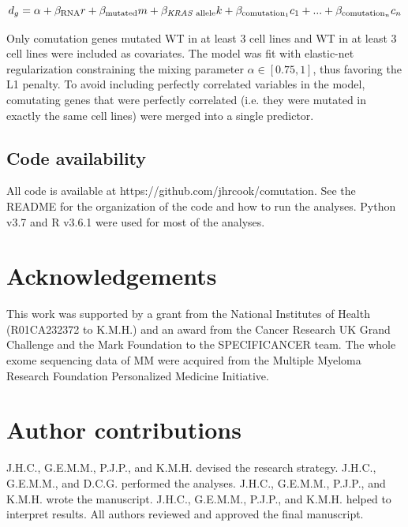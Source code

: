 \documentclass[english, 10pt, letterpaper]{article}
\newcommand{\KRAS}{\emph{KRAS}}
\begin{document}
\begin{equation}
\label{eq:comutation-genetic-dep-model}
d_g = \alpha + \beta_{\text{RNA}}r +\beta_{\text{mutated}}m + \beta_{\text{\KRAS{} allele}}k + \beta_{\text{comutation}_1}c_1 + ... + \beta_{\text{comutation}_n}c_n
\end{equation}

Only comutation genes mutated WT in at least 3 cell lines and WT in at least 3 cell lines were included as covariates.
The model was fit with elastic-net regularization \cite{Zou2005RegularizationNet} constraining the mixing parameter $\alpha \in [0.75, 1]$, thus favoring the L1 penalty.
To avoid including perfectly correlated variables in the model, comutating genes that were perfectly correlated (i.e. they were mutated in exactly the same cell lines) were merged into a single predictor.


\subsection*{Code availability}

All code is available at https://github.com/jhrcook/comutation.
See the README for the organization of the code and how to run the analyses.
Python v3.7 \cite{van1995python} and R v3.6.1 \cite{Rlang} were used for most of the analyses.



\section*{Acknowledgements}

This work was supported by a grant from the National Institutes of Health (R01CA232372 to K.M.H.) and an award from the Cancer Research UK Grand Challenge and the Mark Foundation to the SPECIFICANCER team. 
The whole exome sequencing data of MM were acquired from the Multiple Myeloma Research Foundation Personalized Medicine Initiative.

\section*{Author contributions}

J.H.C., G.E.M.M., P.J.P., and K.M.H. devised the research strategy. 
J.H.C., G.E.M.M., and D.C.G. performed the analyses. 
J.H.C., G.E.M.M., P.J.P., and K.M.H. wrote the manuscript. 
J.H.C., G.E.M.M., P.J.P., and K.M.H. helped to interpret results. 
All authors reviewed and approved the final manuscript.
\end{document}
